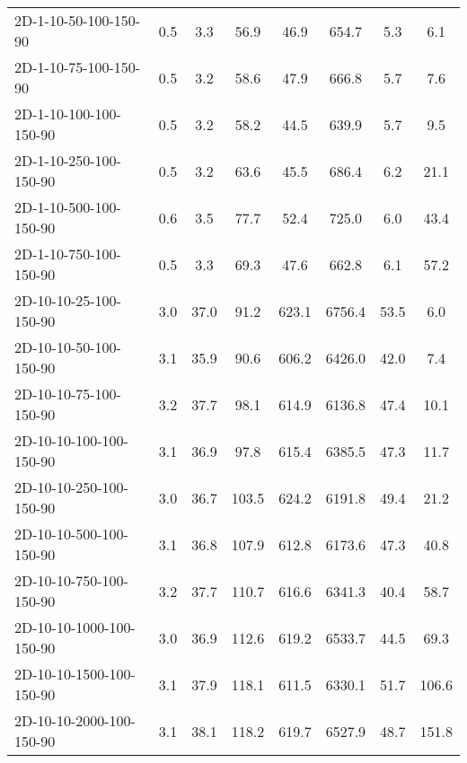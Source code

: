 \documentclass{article}
\begin{document}
\begin{table}[h]
\begin{center}
\begin{tabular}{|l||c|c|c|c|c|c|c|}
            2D-1-10-50-100-150-90          & 0.5  & 3.3       & 56.9       & 46.9        & 654.7    & 5.3       & 6.1        \\
            2D-1-10-75-100-150-90          & 0.5  & 3.2       & 58.6       & 47.9        & 666.8    & 5.7       & 7.6        \\
            2D-1-10-100-100-150-90         & 0.5  & 3.2       & 58.2       & 44.5        & 639.9    & 5.7       & 9.5        \\
            2D-1-10-250-100-150-90         & 0.5  & 3.2       & 63.6       & 45.5        & 686.4    & 6.2       & 21.1       \\
            2D-1-10-500-100-150-90         & 0.6  & 3.5       & 77.7       & 52.4        & 725.0    & 6.0       & 43.4       \\
            2D-1-10-750-100-150-90         & 0.5  & 3.3       & 69.3       & 47.6        & 662.8    & 6.1       & 57.2       \\
            \hline
            2D-10-10-25-100-150-90         & 3.0  & 37.0      & 91.2       & 623.1       & 6756.4   & 53.5      & 6.0        \\
            2D-10-10-50-100-150-90         & 3.1  & 35.9      & 90.6       & 606.2       & 6426.0   & 42.0      & 7.4        \\
            2D-10-10-75-100-150-90         & 3.2  & 37.7      & 98.1       & 614.9       & 6136.8   & 47.4      & 10.1       \\
            2D-10-10-100-100-150-90        & 3.1  & 36.9      & 97.8       & 615.4       & 6385.5   & 47.3      & 11.7       \\
            2D-10-10-250-100-150-90        & 3.0  & 36.7      & 103.5      & 624.2       & 6191.8   & 49.4      & 21.2       \\
            2D-10-10-500-100-150-90        & 3.1  & 36.8      & 107.9      & 612.8       & 6173.6   & 47.3      & 40.8       \\
            2D-10-10-750-100-150-90        & 3.2  & 37.7      & 110.7      & 616.6       & 6341.3   & 40.4      & 58.7       \\
            2D-10-10-1000-100-150-90       & 3.0  & 36.9      & 112.6      & 619.2       & 6533.7   & 44.5      & 69.3       \\
            2D-10-10-1500-100-150-90       & 3.1  & 37.9      & 118.1      & 611.5       & 6330.1   & 51.7      & 106.6      \\
            2D-10-10-2000-100-150-90       & 3.1  & 38.1      & 118.2      & 619.7       & 6527.9   & 48.7      & 151.8      \\

\end{tabular}
\end{center}
\end{table}
\end{document}
